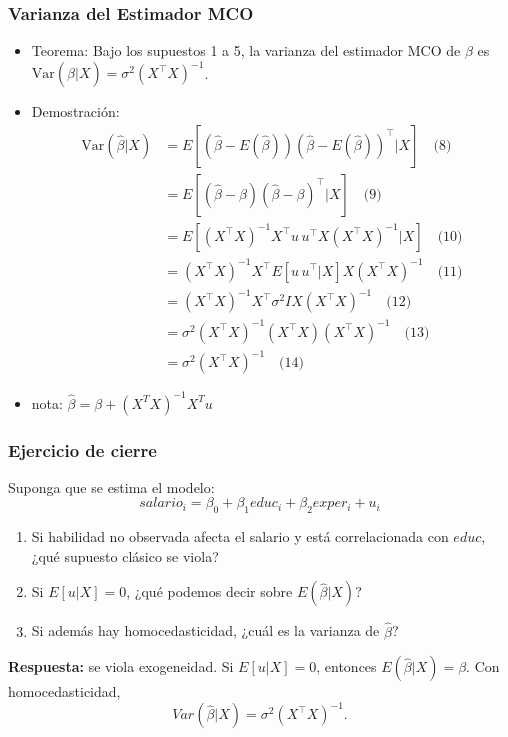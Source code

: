 \documentclass{beamer}
\begin{document}
\begin{frame}
\frametitle{Varianza del Estimador MCO}
\begin{itemize}
    \item Teorema: Bajo los supuestos 1 a 5, la varianza del estimador MCO de $\beta$ es $\text{Var}(\hat{\beta}|X) = \sigma^2(X^{\top}X)^{-1}$.
    \item Demostración:
    \begin{align*}
        \text{Var}(\hat{\beta}|X) &= E[(\hat{\beta} - E(\hat{\beta}))(\hat{\beta} - E(\hat{\beta}))^{\top}|X] \quad \text{(8)} \\
        &= E[(\hat{\beta} - \beta)(\hat{\beta} - \beta)^{\top}|X] \quad \text{(9)} \\
        &= E[(X^{\top}X)^{-1}X^{\top}u \, u^{\top}X(X^{\top}X)^{-1}|X] \quad \text{(10)} \\
        &= (X^{\top}X)^{-1}X^{\top}E[u \, u^{\top}|X]X(X^{\top}X)^{-1} \quad \text{(11)} \\
        &= (X^{\top}X)^{-1}X^{\top}\sigma^2IX(X^{\top}X)^{-1} \quad \text{(12)} \\
        &= \sigma^2(X^{\top}X)^{-1}(X^{\top}X)(X^{\top}X)^{-1} \quad \text{(13)} \\
        &= \sigma^2(X^{\top}X)^{-1} \quad \text{(14)}
    \end{align*}
    \item nota:  $\hat{\beta}=\beta+(X^{T}X)^{-1}X^{T}u$
\end{itemize}
\end{frame}

\begin{frame}
\frametitle{Ejercicio de cierre}

Suponga que se estima el modelo:
\[
salario_i=\beta_0+\beta_1 educ_i+\beta_2 exper_i+u_i
\]

\begin{enumerate}
    \item Si habilidad no observada afecta el salario y está correlacionada con \(educ\), ¿qué supuesto clásico se viola?
    \item Si \(E[u|X]=0\), ¿qué podemos decir sobre \(E(\hat{\beta}|X)\)?
    \item Si además hay homocedasticidad, ¿cuál es la varianza de \(\hat{\beta}\)?
\end{enumerate}

\vspace{0.2cm}
\textbf{Respuesta:} se viola exogeneidad. Si \(E[u|X]=0\), entonces \(E(\hat{\beta}|X)=\beta\). Con homocedasticidad,
\[
Var(\hat{\beta}|X)=\sigma^2(X^\top X)^{-1}.
\]

\end{frame}
\end{document}
